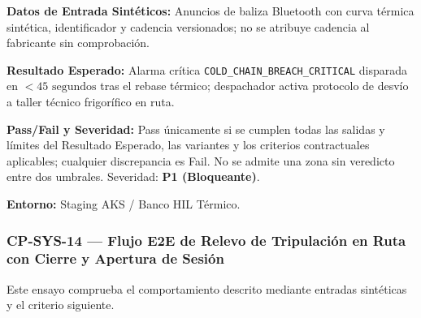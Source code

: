 \par\noindent\textbf{Datos de Entrada Sintéticos:} Anuncios de baliza Bluetooth con curva térmica sintética, identificador y cadencia versionados; no se atribuye cadencia al fabricante sin comprobación.\par
\par\noindent\textbf{Resultado Esperado:} Alarma crítica \texttt{COLD\_\allowbreak{}CHAIN\_\allowbreak{}BREACH\_\allowbreak{}CRITICAL} disparada en \(< 45\text{ segundos}\) tras el rebase térmico; despachador activa protocolo de desvío a taller técnico frigorífico en ruta.\par
\par\noindent\textbf{Pass/Fail y Severidad:} Pass únicamente si se cumplen todas las salidas y límites del Resultado Esperado, las variantes y los criterios contractuales aplicables; cualquier discrepancia es Fail. No se admite una zona sin veredicto entre dos umbrales. Severidad: \textbf{P1 (Bloqueante)}.\par
\par\noindent\textbf{Entorno:} Staging AKS / Banco HIL Térmico.\par


\subsubsection*{CP-SYS-14 — Flujo E2E de Relevo de Tripulación en Ruta con Cierre y Apertura de Sesión}\label{sec:9-cp-sys-14}
Este ensayo comprueba el comportamiento descrito mediante entradas sintéticas y el criterio siguiente.


